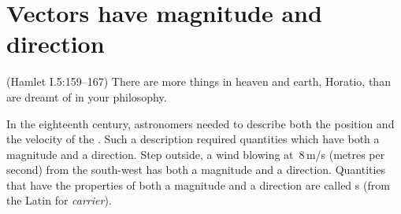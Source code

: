 
\section{Vectors have magnitude and direction}
\label{sec:vhmd}
{}

\begin{quoted}{(Hamlet I.5:159--167)}
There are more things in heaven and earth, Horatio, than are dreamt of in your philosophy.
\end{quoted}

In the eighteenth century, astronomers needed to describe both the position and the velocity of the . 
Such a description required quantities which have both a magnitude and a direction.
Step outside, a wind blowing at~\(8\)\,m/s (metres per second) from the south-west has both a magnitude and a direction.
Quantities that have the properties of both a magnitude and a 
direction are called s (from the Latin for \emph{carrier}).

